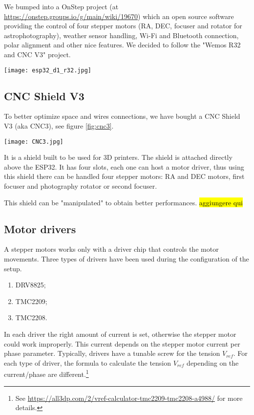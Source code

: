 We bumped into a OnStep project (at \url{https://onstep.groups.io/g/main/wiki/19670}) which an open source software providing the control of four stepper motors (RA, DEC, focuser and rotator for astrophotography), weather sensor handling, Wi-Fi and Bluetooth connection, polar alignment and other nice features.
We decided to follow the "Wemos R32 and CNC V3" project.

\begin{minipage}
    {.4\textwidth}
    \centering
    \texttt{[image: esp32\_d1\_r32.jpg]}
    \label{fig:esp32}
\end{minipage}

\subsection{CNC Shield V3}
To better optimize space and wires connections, we have bought a CNC Shield V3 (aka CNC3), see figure \ref{fig:cnc3}.
\begin{minipage}
    {0.5\textwidth}
    \centering
    \texttt{[image: CNC3.jpg]}
    \label{fig:cnc3}
\end{minipage}
It is a shield built to be used for 3D printers.
The shield is attached directly above the ESP32.
It has four slots, each one can host a motor driver, thus using this shield there can be handled four stepper motors: RA and DEC motors, first focuser and photography rotator or second focuser.

This shield can be "manipulated" to obtain better performances.
\hl{aggiungere qui}

\subsection{Motor drivers}
A stepper motors works only with a driver chip that controls the motor movements.
Three types of drivers have been used during the configuration of the setup.
\begin{enumerate}
    \item DRV8825;
    \item TMC2209;
    \item TMC2208.
\end{enumerate}

In each driver the right amount of current is set, otherwise the stepper motor could work improperly.
This current depends on the stepper motor current per phase parameter.
Typically, drivers have a tunable screw for the tension \(V_{ref}\).
For each type of driver, the formula to calculate the tension \(V_{ref}\) depending on the current/phase are different.\footnote{See \url{https://all3dp.com/2/vref-calculator-tmc2209-tmc2208-a4988/} for more details.}

